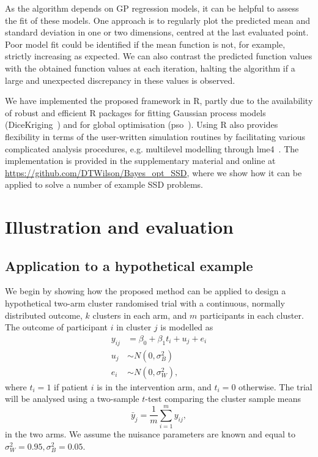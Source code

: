 \documentclass[sagev, Crown]{sagej}
\begin{document}
As the algorithm depends on GP regression models, it can be helpful to assess the fit of these models. One approach is to regularly plot the predicted mean and standard deviation in one or two dimensions, centred at the last evaluated point. Poor model fit could be identified if the mean function is not, for example, strictly increasing as expected. We can also contrast the predicted function values with the obtained function values at each iteration, halting the algorithm if a large and unexpected discrepancy in these values is observed.

We have implemented the proposed framework in R, partly due to the availability of robust and efficient R packages for fitting Gaussian process models (DiceKriging~\cite{Roustant2012}) and for global optimisation (pso~\cite{Bendtsen2012}). Using R also provides flexibility in terms of the user-written simulation routines by facilitating various complicated analysis procedures, e.g. multilevel modelling through lme4~\cite{Bates2015}. The implementation is provided in the supplementary material and online at \url{https://github.com/DTWilson/Bayes_opt_SSD}, where we show how it can be applied to solve a number of example SSD problems.

\section{Illustration and evaluation}\label{sec:eval}

\subsection{Application to a hypothetical example}\label{sec:ex1}

We begin by showing how the proposed method can be applied to design a hypothetical two-arm cluster randomised trial with a continuous, normally distributed outcome, $k$ clusters in each arm, and $m$ participants in each cluster. The outcome of participant $i$ in cluster $j$ is modelled as
\begin{align}
y_{ij} &= \beta_0 + \beta_1 t_i + u_j + e_i \\
u_j & \sim N(0, \sigma_B^2) \\
e_i & \sim N(0, \sigma_W^2),
\end{align}
where $t_i = 1$ if patient $i$ is in the intervention arm, and $t_i = 0$ otherwise. The trial will be analysed using a two-sample $t$-test comparing the cluster sample means
$$
\bar{y}_j = \frac{1}{m} \sum_{i=1}^m y_{ij},
$$
in the two arms. We assume the nuisance parameters are known and equal to $\sigma_W^2 = 0.95, \sigma_B^2 = 0.05$. 
\end{document}
